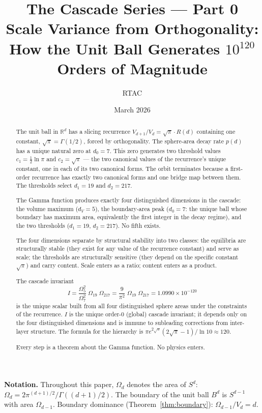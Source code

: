 \documentclass[11pt,a4paper]{article}
\title{The Cascade Series --- Part 0\\[0.5em]
\large Scale Variance from Orthogonality:\\
How the Unit Ball Generates $10^{120}$ Orders of Magnitude}
\author{RTAC}
\date{March 2026}
\begin{document}
\maketitle

\begin{abstract}
The unit ball in $\mathbb{R}^d$ has a slicing recurrence
$V_{d+1}/V_d = \sqrt{\pi}\cdot R(d)$ containing one constant,
$\sqrt{\pi} = \Gamma(1/2)$, forced by orthogonality. The sphere-area decay
rate $p(d)$ has a unique natural zero at $d_0 = 7$. This zero generates
two threshold values $c_1 = \tfrac{1}{2}\ln\pi$ and $c_2 = \sqrt{\pi}$ ---
the two canonical values of the recurrence's unique constant, one in each
of its two canonical forms. The orbit terminates because a first-order
recurrence has exactly two canonical forms and one bridge map between them.
The thresholds select $d_1 = 19$ and $d_2 = 217$.

The Gamma function produces exactly four distinguished dimensions in the
cascade: the volume maximum ($d_V = 5$), the boundary-area peak
($d_0 = 7$: the unique ball whose boundary has maximum area, equivalently
the first integer in the decay regime), and the two thresholds
($d_1 = 19$, $d_2 = 217$). No fifth exists.

The four dimensions separate by structural stability into two classes:
the equilibria are structurally stable (they exist for any value of the
recurrence constant) and serve as scale; the thresholds are structurally
sensitive (they depend on the specific constant $\sqrt{\pi}$) and carry
content. Scale enters as a ratio; content enters as a product.

The cascade invariant
\[
I = \frac{\Omega_5^2}{\Omega_7^2}\;\Omega_{19}\;\Omega_{217}
= \frac{9}{\pi^2}\;\Omega_{19}\;\Omega_{217}
= 1.0990\times 10^{-120}
\]
is the unique scalar built from all four distinguished sphere areas under
the constraints of the recurrence. $I$ is the unique order-0 (global)
cascade invariant; it depends only on the four distinguished dimensions
and is immune to subleading corrections from inter-layer structure. The
formula for the hierarchy
is $\pi e^{2\sqrt{\pi}}(2\sqrt{\pi}-1)/\ln 10\approx 120$.

Every step is a theorem about the Gamma function. No physics enters.
\end{abstract}

\medskip\noindent\textbf{Notation.}
Throughout this paper, $\Omega_d$ denotes the area of $S^d$:
$\Omega_d = 2\pi^{(d+1)/2}/\Gamma((d+1)/2)$. The boundary of the unit
ball $B^d$ is $S^{d-1}$ with area $\Omega_{d-1}$. Boundary dominance
(Theorem~\ref{thm:boundary}): $\Omega_{d-1}/V_d = d$.
\end{document}
